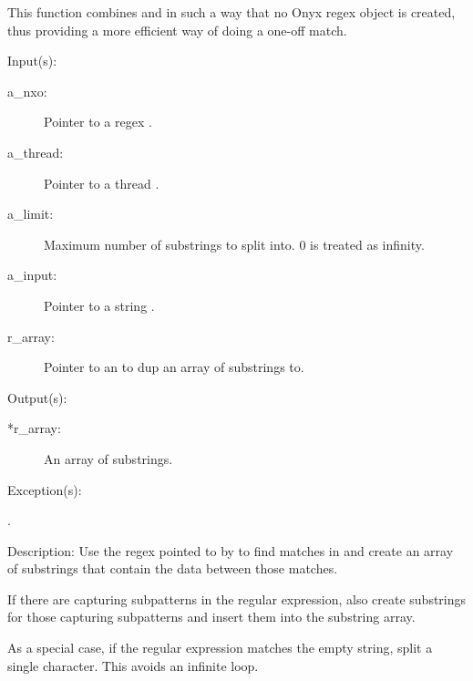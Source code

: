 \begin{capi}
\begin{capilist}
		This function combines  and
		 in such a way that no Onyx regex
		object is created, thus providing a more efficient way of doing
		a one-off match.
	\end{capilist}
\label{nxo_regex_split}
	\begin{capilist}
	\item[Input(s): ]
		\begin{description}\item[]
		\item[a\_nxo: ]
			Pointer to a regex .
		\item[a\_thread: ]
			Pointer to a thread .
		\item[a\_limit: ]
			Maximum number of substrings to split 
			into.  0 is treated as infinity.
		\item[a\_input: ]
			Pointer to a string .
		\item[r\_array: ]
			Pointer to an  to dup an array of
			substrings to.
		\end{description}
	\item[Output(s): ]
		\begin{description}\item[]
		\item[*r\_array: ] An array of substrings.
		\end{description}
	\item[Exception(s): ]
		\begin{description}\item[]
		\item[.]
		\end{description}
	\item[Description: ]
		Use the regex pointed to by  to find matches in
		 and create an array of substrings that contain
		the data between those matches.

		If there are capturing subpatterns in the regular expression,
		also create substrings for those capturing subpatterns and
		insert them into the substring array.

		As a special case, if the regular expression matches the empty
		string, split a single character.  This avoids an infinite
		loop.


\end{capilist}
\end{capi}
